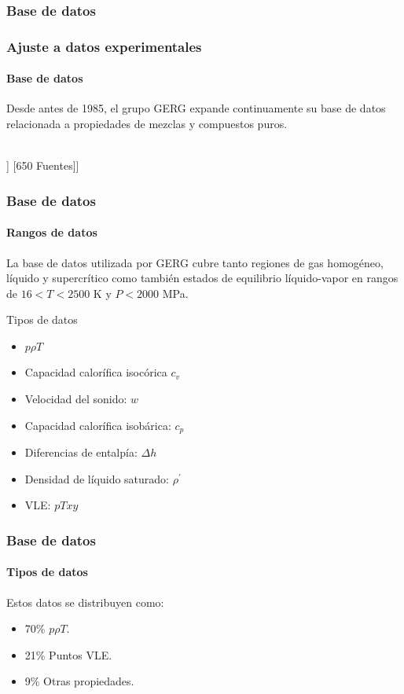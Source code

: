 \documentclass[aspectratio=1610,multi,rgb]{beamer}
\begin{document}
\subsubsection{Base de datos}
\begin{frame}
	\frametitle{Ajuste a datos experimentales}
	\framesubtitle{Base de datos}

	Desde antes de 1985, el grupo GERG expande continuamente su base
	de datos relacionada a propiedades de mezclas y compuestos puros.\\~\\

	\begin{forest}
		[Base datos GERG
		[125000 Puntos experimentales
		[Mezclas binarias]
		[Gases naturales]
		[Mezclas multicomponente]]
		[650 Fuentes]]
	\end{forest}

\end{frame}

\begin{frame}
	\frametitle{Base de datos}
	\framesubtitle{Rangos de datos}
	La base de datos utilizada por GERG cubre tanto regiones de gas
	homogéneo, líquido y supercrítico como también estados de equilibrio
	líquido-vapor en rangos de $ 16 < T < 2500$ K y $P < 2000$ MPa.
	
	\begin{block}{Tipos de datos}
	\begin{itemize}
		\item $p \rho T$
		\item Capacidad calorífica isocórica $c_v$
		\item Velocidad del sonido: $w$
		\item Capacidad calorífica isobárica: $c_p$
		\item Diferencias de entalpía: $\Delta h$
		\item Densidad de líquido saturado: $\rho^{'}$
		\item VLE: $pTxy$
	\end{itemize}
	\end{block}
\end{frame}
\begin{frame}
	\frametitle{Base de datos}
	\framesubtitle{Tipos de datos}
	Estos datos se distribuyen como:

	\begin{itemize}
		\item 70\% $p \rho T$.
		\item 21\% Puntos VLE.
		\item 9\%  Otras propiedades.
	\end{itemize} 

	
\end{frame}
\end{document}
